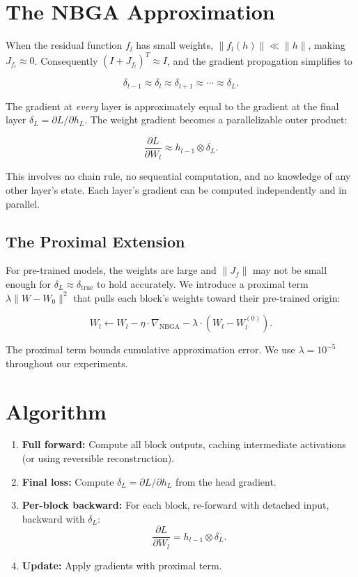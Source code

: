 \documentclass[11pt]{article}
\begin{document}
\section{The NBGA Approximation}

When the residual function $f_l$ has small weights, $\|f_l(h)\| \ll \|h\|$, making $J_{f_l} \approx 0$. Consequently $(I + J_{f_l})^T \approx I$, and the gradient propagation simplifies to

\[
\delta_{l-1} \approx \delta_l \approx \delta_{l+1} \approx \cdots \approx \delta_L.
\]

The gradient at \emph{every} layer is approximately equal to the gradient at the final layer $\delta_L = \partial L / \partial h_L$. The weight gradient becomes a parallelizable outer product:

\[
\frac{\partial L}{\partial W_l} \approx h_{l-1} \otimes \delta_L.
\]

This involves no chain rule, no sequential computation, and no knowledge of any other layer's state. Each layer's gradient can be computed independently and in parallel.

\subsection{The Proximal Extension}

For pre-trained models, the weights are large and $\|J_f\|$ may not be small enough for $\delta_L \approx \delta_{\text{true}}$ to hold accurately. We introduce a proximal term $\lambda\|W - W_0\|^2$ that pulls each block's weights toward their pre-trained origin:

\[
W_l \gets W_l - \eta \cdot \nabla_{\text{NBGA}} - \lambda \cdot (W_l - W_l^{(0)}).
\]

The proximal term bounds cumulative approximation error. We use $\lambda = 10^{-5}$ throughout our experiments.

\section{Algorithm}

\begin{enumerate}
\item \textbf{Full forward:} Compute all block outputs, caching intermediate activations (or using reversible reconstruction).
\item \textbf{Final loss:} Compute $\delta_L = \partial L / \partial h_L$ from the head gradient.
\item \textbf{Per-block backward:} For each block, re-forward with detached input, backward with $\delta_L$:
   \[\frac{\partial L}{\partial W_l} = h_{l-1} \otimes \delta_L.\]
\item \textbf{Update:} Apply gradients with proximal term.
\end{enumerate}
\end{document}
